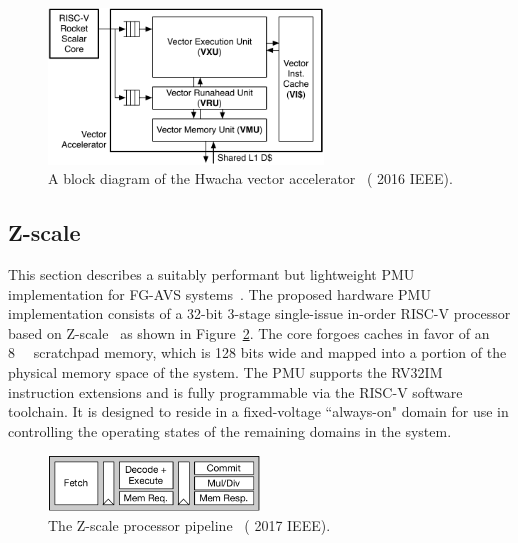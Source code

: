\documentclass[graybox]{svmult}
\begin{document}
\begin{figure}
  \centering
  \includegraphics[width=0.65\textwidth]{6-raven3-hwacha}
  \caption{A block diagram of the Hwacha vector accelerator~\cite{Zimmer2016} ({\textcopyright} 2016 IEEE).}
  \label{fig:6-raven3-hwacha}
\end{figure}


\subsection{Z-scale}

This section describes a suitably performant but lightweight PMU implementation for FG-AVS systems~\cite{Keller2017}.
The proposed hardware PMU implementation consists of a 32-bit 3-stage single-issue in-order RISC-V processor based on Z-scale~\cite{zscale} as shown in Figure~\ref{fig:4-zscale}.
The core forgoes caches in favor of an \SI{8}{\kibi\byte} scratchpad memory, which is 128 bits wide and mapped into a portion of the physical memory space of the system.
The PMU supports the RV32IM instruction extensions and is fully programmable via the RISC-V software toolchain.
It is designed to reside in a fixed-voltage ``always-on" domain for use in controlling the operating states of the remaining domains in the system.

\begin{figure}
  \centering
  \includegraphics[width=0.5\textwidth]{4-zscale}
  \caption{The Z-scale processor pipeline~\cite{Keller2017} ({\textcopyright} 2017 IEEE).}
  \label{fig:4-zscale}
\end{figure}
\end{document}

